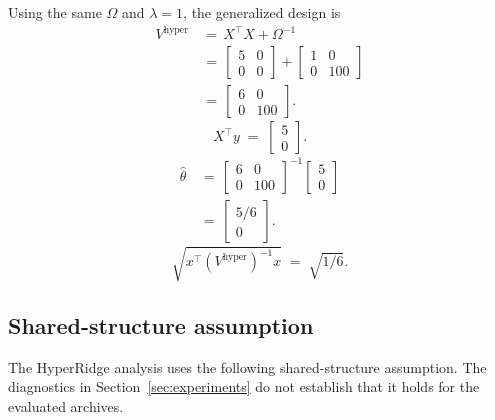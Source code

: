 \documentclass{article} %
\begin{document}
Using the same \(\Omega\) and \(\lambda=1\), the generalized design is
\begin{equation}
\label{eq:hyper-example-V}
\begin{aligned}
V^{\mathrm{hyper}}
&\,=\,
X^\top X+\Omega^{-1}
\\
&\,=\,
\begin{bmatrix}
5&0\\
0&0
\end{bmatrix}
+
\begin{bmatrix}
1&0\\
0&100
\end{bmatrix}
\\
&\,=\,
\begin{bmatrix}
6&0\\
0&100
\end{bmatrix}.
\end{aligned}
\end{equation}
\begin{equation}
\label{eq:hyper-example-Xty}
X^\top y
\;=\;
\begin{bmatrix}
5\\
0
\end{bmatrix}.
\end{equation}
\begin{equation}
\label{eq:hyper-example-theta}
\begin{aligned}
\widehat{\theta}
&\,=\,
\begin{bmatrix}
6&0\\
0&100
\end{bmatrix}^{-1}
\begin{bmatrix}
5\\
0
\end{bmatrix}
\\
&\,=\,
\begin{bmatrix}
5/6\\
0
\end{bmatrix}.
\end{aligned}
\end{equation}
\begin{equation}
\label{eq:hyper-example-width}
\sqrt{x^\top (V^{\mathrm{hyper}})^{-1}x}
\;=\;
\sqrt{1/6}.
\end{equation}

\subsection{Shared-structure assumption}

The HyperRidge analysis uses the following shared-structure assumption. The diagnostics in Section~\ref{sec:experiments} do not establish that it holds for the evaluated archives.
\end{document}
